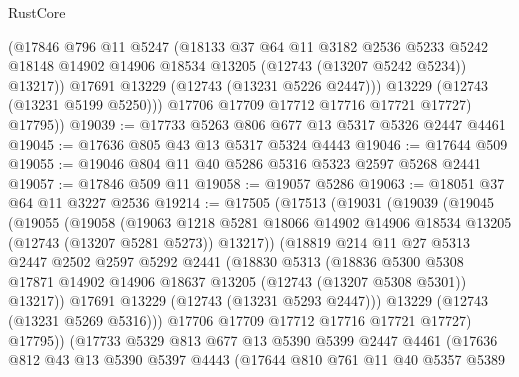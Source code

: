 \begin{lexlean}{RustCore}
\begin{coremodule}
              (@17846
                @796
                @11
                @5247
                (@18133
                  @37
                  @64
                  @11
                  @3182
                  @2536
                  @5233
                  @5242
                  @18148
                  @14902
                  @14906
                  @18534
                  @13205
                  (@12743 (@13207 @5242 @5234))
                  @13217))
              @17691
              @13229
              (@12743 (@13231 @5226 @2447)))
            @13229
            (@12743 (@13231 @5199 @5250)))
          @17706
          @17709
          @17712
          @17716
          @17721
          @17727)
        @17795))
@19039 := @17733 @5263 @806 @677 @13 @5317 @5326 @2447 @4461
@19045 := @17636 @805 @43 @13 @5317 @5324 @4443
@19046 := @17644 @509
@19055 := @19046 @804 @11 @40 @5286 @5316 @5323 @2597 @5268 @2441
@19057 := @17846 @509 @11
@19058 := @19057 @5286
@19063 := @18051 @37 @64 @11 @3227 @2536
@19214 := @17505
    (@17513
      (@19031
        (@19039
          (@19045
            (@19055
              (@19058
                (@19063
                  @1218
                  @5281
                  @18066
                  @14902
                  @14906
                  @18534
                  @13205
                  (@12743 (@13207 @5281 @5273))
                  @13217))
              (@18819
                @214
                @11
                @27
                @5313
                @2447
                @2502
                @2597
                @5292
                @2441
                (@18830
                  @5313
                  (@18836
                    @5300
                    @5308
                    @17871
                    @14902
                    @14906
                    @18637
                    @13205
                    (@12743 (@13207 @5308 @5301))
                    @13217))
                @17691
                @13229
                (@12743 (@13231 @5293 @2447)))
              @13229
              (@12743 (@13231 @5269 @5316)))
            @17706
            @17709
            @17712
            @17716
            @17721
            @17727)
          @17795))
      (@17733
        @5329
        @813
        @677
        @13
        @5390
        @5399
        @2447
        @4461
        (@17636
          @812
          @43
          @13
          @5390
          @5397
          @4443
          (@17644
            @810
            @761
            @11
            @40
            @5357
            @5389

\end{coremodule}
\end{lexlean}
